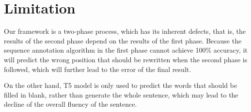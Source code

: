 \section{Limitation}

Our framework is a two-phase process, which has its inherent defects, that is, the results of the second phase depend on the results of the first phase. Because the sequence annotation algorithm in the first phase cannot achieve 100\% accuracy, it will predict the wrong position that should be rewritten when the second phase is followed, which will further lead to the error of the final result.

On the other hand, T5 model is only used to predict the words that should be filled in blank, rather than generate the whole sentence, which may lead to the decline of the overall fluency of the sentence.
